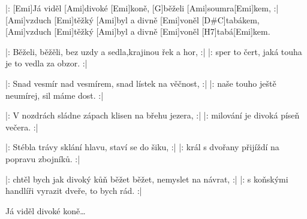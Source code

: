 
\sloka
|: [Emi]Já viděl [Ami]divoké [Emi]koně, [G]běželi [Ami]soumra[Emi]kem, :|
[Ami]vzduch [Emi]těžký [Ami]byl a divně [Emi]voněl [D#\dim C]tabákem,
[Ami]vzduch [Emi]těžký [Ami]byl a divně [Emi]voněl [H7]tabá[Emi]kem.

\sloka
|: Běželi, běžěli, bez uzdy a sedla,krajinou řek a hor, :|
|: sper to čert, jaká touha je to vedla za obzor. :|

\sloka
|: Snad vesmír nad vesmírem, snad lístek na věčnost, :|
|: naše touho ještě neumírej, sil máme dost. :|

\sloka
|: V nozdrách sládne zápach klisen na břehu jezera, :|
|: milování je divoká píseň večera. :|

\sloka
|: Stébla trávy sklání hlavu, staví se do šiku, :|
|: král s dvořany přijíždí na popravu zbojníků. :|

\sloka
|: chtěl bych jak divoký kůň běžet běžet, nemyslet na návrat, :|
|: s koňskými handlíři vyrazit dveře, to bych rád. :|

\napis{}
Já viděl divoké koně… 
